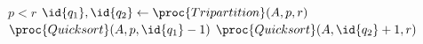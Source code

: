 \begin{codebox}
\li \If $p < r$
\li	\Then
		$\id{q_1},\id{q_2} \gets \proc{Tripartition}(A,p,r)$
\li		$\proc{Quicksort}(A,p,\id{q_1}-1)$
\li		$\proc{Quicksort}(A,\id{q_2}+1,r)$
	\End
\end{codebox} 
